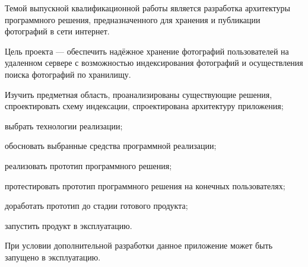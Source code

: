 
Темой выпускной квалификационной работы является разработка архитектуры программного решения, предназначенного для хранения и публикации фотографий в сети интернет.

Цель проекта — обеспечить надёжное хранение фотографий пользователей на удаленном сервере с возможностью индексирования фотографий и осуществления поиска фотографий по хранилищу. 

Изучить предметная область, проанализированы существующие решения, спроектировать схему индексации, спроектирована архитектуру приложения;
    \item выбрать технологии реализации;
    \item обосновать выбранные средства программной реализации;
    \item реализовать прототип программного решения;
    \item протестировать прототип программного решения на конечных пользователях;
    \item доработать прототип до стадии готового продукта;
    \item запустить продукт в эксплуатацию.

При условии дополнительной разработки данное приложение может быть запущено в эксплуатацию.

\clearpage